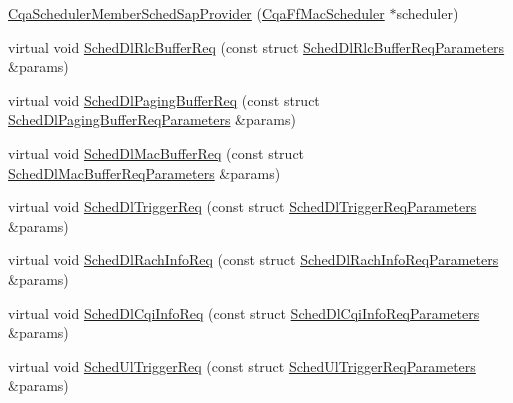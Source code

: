 \begin{DoxyCompactItemize}
\item 
\hyperlink{classns3_1_1CqaSchedulerMemberSchedSapProvider_af2c9dc99afe84445d9e6d4ae61f74023}{Cqa\+Scheduler\+Member\+Sched\+Sap\+Provider} (\hyperlink{classns3_1_1CqaFfMacScheduler}{Cqa\+Ff\+Mac\+Scheduler} $\ast$scheduler)
\item 
virtual void \hyperlink{classns3_1_1CqaSchedulerMemberSchedSapProvider_a5c5f595d5f8b9babdacfe3ef8408da74}{Sched\+Dl\+Rlc\+Buffer\+Req} (const struct \hyperlink{structns3_1_1FfMacSchedSapProvider_1_1SchedDlRlcBufferReqParameters}{Sched\+Dl\+Rlc\+Buffer\+Req\+Parameters} \&params)
\item 
virtual void \hyperlink{classns3_1_1CqaSchedulerMemberSchedSapProvider_a6d98cbf76f61c1ef532731983c136991}{Sched\+Dl\+Paging\+Buffer\+Req} (const struct \hyperlink{structns3_1_1FfMacSchedSapProvider_1_1SchedDlPagingBufferReqParameters}{Sched\+Dl\+Paging\+Buffer\+Req\+Parameters} \&params)
\item 
virtual void \hyperlink{classns3_1_1CqaSchedulerMemberSchedSapProvider_aac95193ef4ac1663a4af1779b259d528}{Sched\+Dl\+Mac\+Buffer\+Req} (const struct \hyperlink{structns3_1_1FfMacSchedSapProvider_1_1SchedDlMacBufferReqParameters}{Sched\+Dl\+Mac\+Buffer\+Req\+Parameters} \&params)
\item 
virtual void \hyperlink{classns3_1_1CqaSchedulerMemberSchedSapProvider_a1703258d77aa4653af04f43b2f294700}{Sched\+Dl\+Trigger\+Req} (const struct \hyperlink{structns3_1_1FfMacSchedSapProvider_1_1SchedDlTriggerReqParameters}{Sched\+Dl\+Trigger\+Req\+Parameters} \&params)
\item 
virtual void \hyperlink{classns3_1_1CqaSchedulerMemberSchedSapProvider_ae71a95a9ec6c65efe3809f277c57a686}{Sched\+Dl\+Rach\+Info\+Req} (const struct \hyperlink{structns3_1_1FfMacSchedSapProvider_1_1SchedDlRachInfoReqParameters}{Sched\+Dl\+Rach\+Info\+Req\+Parameters} \&params)
\item 
virtual void \hyperlink{classns3_1_1CqaSchedulerMemberSchedSapProvider_ab93ca43e7b27973b45b57598058ac1dc}{Sched\+Dl\+Cqi\+Info\+Req} (const struct \hyperlink{structns3_1_1FfMacSchedSapProvider_1_1SchedDlCqiInfoReqParameters}{Sched\+Dl\+Cqi\+Info\+Req\+Parameters} \&params)
\item 
virtual void \hyperlink{classns3_1_1CqaSchedulerMemberSchedSapProvider_a70271b0790cb95c275bab34ae175f478}{Sched\+Ul\+Trigger\+Req} (const struct \hyperlink{structns3_1_1FfMacSchedSapProvider_1_1SchedUlTriggerReqParameters}{Sched\+Ul\+Trigger\+Req\+Parameters} \&params)

\end{DoxyCompactItemize}
